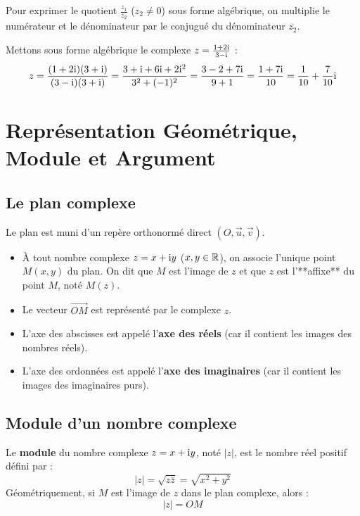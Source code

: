 \begin{methode}
Pour exprimer le quotient $\frac{z_1}{z_2}$ ($z_2 \ne 0$) sous forme algébrique, on multiplie le numérateur et le dénominateur par le conjugué du dénominateur $\overline{z_2}$.
\end{methode}

\begin{exemple}[Quotient]
Mettons sous forme algébrique le complexe $z = \frac{1+2\mathrm{i}}{3-\mathrm{i}}$ :
\[
z = \frac{(1+2\mathrm{i})(3+\mathrm{i})}{(3-\mathrm{i})(3+\mathrm{i})} = \frac{3 + \mathrm{i} + 6\mathrm{i} + 2\mathrm{i}^2}{3^2 + (-1)^2} = \frac{3 - 2 + 7\mathrm{i}}{9 + 1} = \frac{1+7\mathrm{i}}{10} = \frac{1}{10} + \frac{7}{10}\mathrm{i}
\]
\end{exemple}

\section{Représentation Géométrique, Module et Argument}

\subsection{Le plan complexe}

Le plan est muni d'un repère orthonormé direct $(O, \vec{u}, \vec{v})$.
\begin{itemize}
    \item À tout nombre complexe $z = x + \mathrm{i} y$ ($x, y \in \mathbb{R}$), on associe l'unique point $M(x, y)$ du plan.
    On dit que $M$ est l'image de $z$ et que $z$ est l'**affixe** du point $M$, noté $M(z)$.
    \item Le vecteur $\vec{OM}$ est représenté par le complexe $z$.
    \item L'axe des abscisses est appelé l'\textbf{axe des réels} (car il contient les images des nombres réels).
    \item L'axe des ordonnées est appelé l'\textbf{axe des imaginaires} (car il contient les images des imaginaires purs).
\end{itemize}

\subsection{Module d'un nombre complexe}

\begin{definition}[Module]
Le \textbf{module} du nombre complexe $z = x + \mathrm{i} y$, noté $|z|$, est le nombre réel positif défini par :
\[
|z| = \sqrt{z\bar{z}} = \sqrt{x^2 + y^2}
\]
Géométriquement, si $M$ est l'image de $z$ dans le plan complexe, alors :
\[
|z| = OM
\]
\end{definition}

